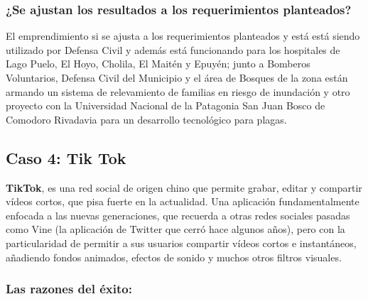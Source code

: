 \documentclass[titlepage,a4paper,twoside]{article}
\theoremstyle{definition}
\numberwithin{algorithm}{section}
\theoremstyle{remark}
\numberwithin{equation}{section}
\begin{document}
    
    \subsubsection{¿Se ajustan los resultados a los requerimientos planteados?}
    
    El emprendimiento si se ajusta a los requerimientos planteados y está está siendo utilizado por Defensa Civil y además está funcionando para los hospitales de Lago Puelo, El Hoyo, Cholila, El Maitén y Epuyén; junto a Bomberos Voluntarios, Defensa Civil del Municipio y el área de Bosques de la zona están armando un sistema de relevamiento de familias en riesgo de inundación y otro proyecto con la Universidad Nacional de la Patagonia San Juan Bosco de Comodoro Rivadavia para un desarrollo tecnológico para plagas.
    
    
    \subsection{Caso 4: Tik Tok}
    
    
    \textbf{TikTok}, es una red social de origen chino que permite grabar, editar y compartir vídeos cortos, que pisa fuerte en la actualidad. Una aplicación fundamentalmente enfocada a las nuevas generaciones, que recuerda a otras redes sociales pasadas como Vine (la aplicación de Twitter que cerró hace algunos años), pero con la particularidad de permitir a sus usuarios compartir vídeos cortos e instantáneos, añadiendo fondos animados, efectos de sonido y muchos otros filtros visuales.
    
    
    \subsubsection{Las razones del éxito:}
    
\end{document}
